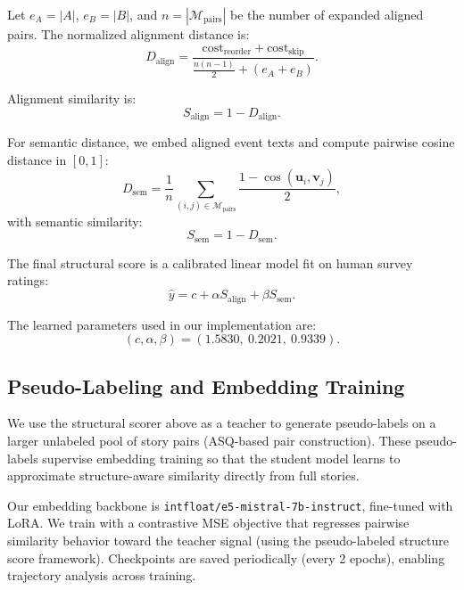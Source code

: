 Let $e_A=|A|$, $e_B=|B|$, and $n=|\mathcal{M}_{\text{pairs}}|$ be the number of expanded aligned pairs. The normalized alignment distance is:
\begin{equation}
D_{\text{align}} = \frac{\text{cost}_{\text{reorder}} + \text{cost}_{\text{skip}}}{\frac{n(n-1)}{2} + (e_A + e_B)}.
\end{equation}

Alignment similarity is:
\begin{equation}
S_{\text{align}} = 1 - D_{\text{align}}.
\end{equation}

For semantic distance, we embed aligned event texts and compute pairwise cosine distance in $[0,1]$:
\begin{equation}
D_{\text{sem}} = \frac{1}{n}\sum_{(i,j)\in\mathcal{M}_{\text{pairs}}} \frac{1-\cos(\mathbf{u}_i,\mathbf{v}_j)}{2},
\end{equation}
with semantic similarity:
\begin{equation}
S_{\text{sem}} = 1 - D_{\text{sem}}.
\end{equation}

The final structural score is a calibrated linear model fit on human survey ratings:
\begin{equation}
\hat{y} = c + \alpha S_{\text{align}} + \beta S_{\text{sem}}.
\end{equation}

The learned parameters used in our implementation are:
\begin{equation}
(c,\alpha,\beta) = (1.5830,\ 0.2021,\ 0.9339).
\end{equation}

\subsection{Pseudo-Labeling and Embedding Training}

We use the structural scorer above as a teacher to generate pseudo-labels on a larger unlabeled pool of story pairs (ASQ-based pair construction). These pseudo-labels supervise embedding training so that the student model learns to approximate structure-aware similarity directly from full stories.

Our embedding backbone is \texttt{intfloat/e5-mistral-7b-instruct}, fine-tuned with LoRA. We train with a contrastive MSE objective that regresses pairwise similarity behavior toward the teacher signal (using the pseudo-labeled structure score framework). Checkpoints are saved periodically (every 2 epochs), enabling trajectory analysis across training.
